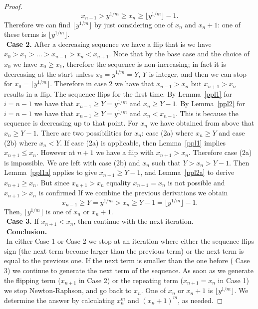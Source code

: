 \documentclass[11pt]{article}
\newcommand{\floor}[1]{\lfloor #1 \rfloor}
\begin{document}
\begin{proof}
\[
x_{n-1} > y^{1/m} \geq x_n  \geq \floor{y^{1/m}} -1.
\]
Therefore we can find $ \floor{y^{1/m}}$ by just considering one
of $x_n$ and $x_n +1$:
one of these terms is $ \floor{y^{1/m}}$.
%
%
%
$ $ \\ $ $
{\bf Case 2.}
After a decreasing sequence we have a flip that is
we have $x_0 > x_1 > \ldots > x_{n-1} > x_n < x_{n+1}$.
Note that by the base case and the choice of $x_0$
we have $x_0 \geq x_1 $, therefore the sequence is non-increasing;
in fact it is decreasing at the start unless $x_0 = y^{1/m} =Y$, 
$Y$ is integer, and then we can stop for $x_0 =\floor{y^{1/m}}$.
Therefore in case 2 we have that $x_{n-1} > x_n$ but $x_{n+1} > x_n$
results in a flip. The sequence flips for the first time. 
By Lemma~\ref{ppl1} for $i=n-1$  we have that
$x_{n-1} \geq Y=y^{1/m}$ and
$x_{n} \geq Y-1$.
By Lemma~\ref{ppl2} for $i=n-1$  we have that
$x_{n-1} \geq Y=y^{1/m}$ and
$x_{n} < x_{n-1}$. This is because the sequence is decreasing
up to that point.
For $x_n$ we have obtained from above that $x_n \geq Y-1$.
There are two possibilities for $x_n$: case (2a) where $x_n \geq Y$
and case (2b) where $x_n < Y$.
If case (2a) is applicable, then Lemma~\ref{ppl1} implies
$x_{n+1} \leq x_n$. However at $n+1$ we have a flip
with $x_{n+1} > x_n$. Therefore case (2a) is impossible.
We are left with case (2b) and $x_n $ such that
$Y > x_n > Y-1$. Then Lemma~\ref{ppl1a} applies to
give $x_{n+1} \geq Y-1$, and Lemma~\ref{ppl2a}
to derive $x_{n+1} \geq x_n$. But since $x_{n+1} > x_{n}$
equality $x_{n+1}=x_n$  is not possible and 
$x_{n+1} > x_n$ is confirmed
If we combine the previous derivations we obtain
\[
x_{n-1} \geq Y= y^{1/m} >    x_n  \geq Y-1 = \floor{y^{1/m}} -1.
\]
Then, $ \floor{y^{1/m}}$ is one of $x_n$ or $x_n +1$.
$ $ \\ $ $
{\bf Case 3.}
If $x_{n+1}<x_n$, then continue with the next iteration.
$ $ \\ $ $
{\bf Conclusion.}
$ $ \\ $ $
In either {    Case 1} or {    Case 2}
we stop at an iteration where either the sequence flips sign
(the next term become larger than the previous term)
or the next term is equal to the previous one.
If the next
term is smaller than the one before ({    Case 3})
we continue to generate the next term of the  sequence.
As soon as we generate the flipping term ($x_{n+1}$ in Case 2)
or the repeating term ($x_{n+1} = x_n$ in Case 1) we stop
Newton-Raphson, and go back to $x_n$. One of
$x_n$ or $x_n +1$ is 
$ \floor{y^{1/m}}$. We determine the answer
by calculating $x_n^{m}$ and $(x_n +1)^m$, as needed.

\end{proof}
\end{document}
